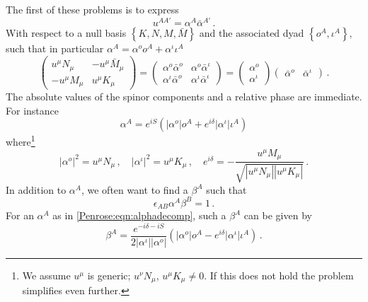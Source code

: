 The first of these problems is to express
\begin{equation}\label{Penrose:eqn:uisalpha2}
u^{A A'} = \alpha^A \bar{\alpha}^{A'} \, .
\end{equation}
With respect to a null basis $\left\lbrace K,N,M,\bar{M} \right\rbrace$ and the associated dyad $\left\lbrace o^A, \iota^{A} \right\rbrace$, such that in particular $\alpha^A = \alpha^o o^A + \alpha^{\iota} \iota^A$
\begin{equation}\label{Penrose:eqn:alphainu}
\begin{pmatrix}
u^{\mu}N_{\mu} & -u^{\mu}\bar{M}_{\mu}  \\
-u^{\mu}M_{\mu} & u^{\mu}K_{\mu}
\end{pmatrix} =  \begin{pmatrix}
\alpha^o \bar{\alpha}^o & \alpha^{o} \bar{\alpha}^{\iota} \\
\alpha^{\iota} \bar{\alpha}^{o} & \alpha^{\iota} \bar{\alpha}^{\iota} 
\end{pmatrix} = \begin{pmatrix}
\alpha^o \\ \alpha^{\iota}
\end{pmatrix} \begin{pmatrix} \bar{\alpha}^o  & \bar{\alpha}^{\iota} \end{pmatrix}\, .
\end{equation}
The absolute values of the spinor components and a relative phase are immediate. For instance
\begin{equation} \label{Penrose:eqn:alphadecomp}
\alpha^A = e^{i S}\left(|\alpha^o| o^A + e^{i \delta}|\alpha^{\iota}| \iota^A\right)
\end{equation}
where\footnote{We assume $u^{\mu}$ is generic; $u^{\nu}N_{\mu}$, $u^{\mu}K_{\mu} \neq 0$. If this does not hold the problem simplifies even further.}
\begin{equation}\label{Penrose:eqn:spinorsfromu} 
|\alpha^o|^2 = u^{\mu}N_{\mu} \, , \quad 	|\alpha^{\iota}|^2 = u^{\mu}K_{\mu} \, , \quad e^{i \delta} = -\frac{u^{\mu}M_{\mu}}{\sqrt{|u^{\mu}N_{\mu} ||u^{\mu}K_{\mu}|}} \, .
\end{equation}
In addition to $\alpha^A$, we often want to find a $\beta^A$ such that
\begin{equation}
\epsilon_{AB}\alpha^A \beta^B = 1 \, .
\end{equation}
For an $\alpha^A$ as in \eqref{Penrose:eqn:alphadecomp}, such a $\beta^A$ can be given by
\begin{equation}\label{Penrose:eqn:betadecomp}
\beta^A = \frac{e^{-i \delta-i S}}{2|\alpha^{\iota}| |\alpha^o|}\left( |\alpha^o| o^A - e^{i \delta} |\alpha^{\iota}| \iota^A\right)\, .
\end{equation}
